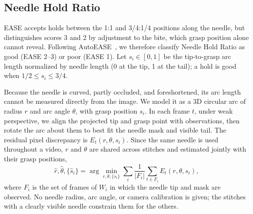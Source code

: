 \subsection{Needle Hold Ratio}
\label{ssec:ratio}

EASE accepts holds between the 1:1 and 3/4:1/4 positions along the needle,
but distinguishes scores 3 and 2 by adjustment to the bite, which grasp
position alone cannot reveal. Following AutoEASE~\cite{Deo2026}, we therefore
classify Needle Hold Ratio as good (EASE 2--3) or poor (EASE 1). Let
$s_i\in[0,1]$ be the tip-to-grasp arc length normalized by needle length (0
at the tip, 1 at the tail); a hold is good when $1/2\leq s_i\leq3/4$.

Because the needle is curved, partly occluded, and foreshortened, its arc
length cannot be measured directly from the image. We model it as a 3D
circular arc of radius $r$ and arc angle $\theta$, with grasp position $s_i$.
In each frame $t$, under weak perspective, we align the projected tip and
grasp point with observations, then rotate the arc about them to best fit the
needle mask and visible tail. The residual pixel discrepancy is
$E_t(r,\theta,s_i)$. Since the same needle is used throughout a video, $r$
and $\theta$ are shared across stitches and estimated jointly with their grasp
positions,
\begin{equation*}
\hat{r},\hat{\theta},\{\hat{s}_i\}=\arg\min_{r,\theta,\{s_i\}}
\sum_i\frac{1}{|F_i|}\sum_{t\in F_i}E_t(r,\theta,s_i),
\end{equation*}
where $F_i$ is the set of frames of $W_i$ in which the needle tip and mask are
observed. No needle radius, arc angle, or camera calibration is given; the
stitches with a clearly visible needle constrain them for the others.

